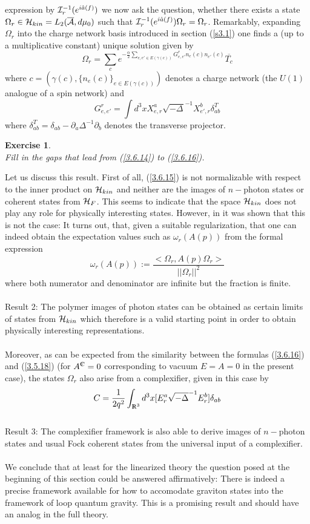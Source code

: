 \documentclass[12pt]{report}
\newtheorem{Exercise}{Exercise}[section]
\def\be{\begin{equation}}
\def\ee{\end{equation}}
\def\a{{\cal A}}
\def\ab{\overline{\a}}
\def\Rl{{\mathchoice
{\setbox0=\hbox{$\displaystyle\rm R$}\hbox{\hbox to0pt
{\kern0.4\wd0\vrule height0.9\ht0\hss}\box0}}
{\setbox0=\hbox{$\textstyle\rm R$}\hbox{\hbox to0pt
{\kern0.4\wd0\vrule height0.9\ht0\hss}\box0}}
{\setbox0=\hbox{$\scriptstyle\rm R$}\hbox{\hbox to0pt
{\kern0.4\wd0\vrule height0.9\ht0\hss}\box0}}
{\setbox0=\hbox{$\scriptscriptstyle\rm R$}\hbox{\hbox to0pt
{\kern0.4\wd0\vrule height0.9\ht0\hss}\box0}}}}
\def\Cl{{\mathchoice
{\setbox0=\hbox{$\displaystyle\rm C$}\hbox{\hbox to0pt
{\kern0.4\wd0\vrule height0.9\ht0\hss}\box0}}
{\setbox0=\hbox{$\textstyle\rm C$}\hbox{\hbox to0pt
{\kern0.4\wd0\vrule height0.9\ht0\hss}\box0}}
{\setbox0=\hbox{$\scriptstyle\rm C$}\hbox{\hbox to0pt
{\kern0.4\wd0\vrule height0.9\ht0\hss}\box0}}
{\setbox0=\hbox{$\scriptscriptstyle\rm C$}\hbox{\hbox to0pt
{\kern0.4\wd0\vrule height0.9\ht0\hss}\box0}}}}
\begin{document}
expression by ${\cal I}_r^{-1}(e^{i\hat{a}(f)})$ we now ask 
the question, whether there exists a state $\Omega_r\in {\cal H}_{kin}
=L_2(\ab,d\mu_0)$ such that 
${\cal I}_r^{-1}(e^{i\hat{a}(f)})\Omega_r=\Omega_r$. Remarkably, expanding
$\Omega_r$ into the charge network basis introduced in section 
(\ref{s3.1}) one finds a (up to a multiplicative constant) 
unique solution given by
\be \label{3.6.15}
\Omega_r=\sum_c
e^{-\frac{\alpha}{2}\sum_{e,e'\in E(\gamma(c))} G^r_{e,e'} n_e(c) 
n_{e'}(c)} \overline{T_c}
\ee
where $c=(\gamma(c),\{n_e(c)\}_{e\in E(\gamma(c))})$ denotes
a charge network (the $U(1)$ analogue of a spin network) and
\be \label{3.6.16}
G^r_{e,e'}=\int d^3x X^a_{e,r}\sqrt{-\Delta}^{-1} X^b_{e',r}\delta^T_{ab}
\ee
where $\delta_{ab}^T=\delta_{ab}-\partial_a\Delta^{-1}\partial_b$
denotes the transverse projector.
%
\begin{Exercise} \label{ex3.6.1} ~~~~\\
Fill in the gaps that lead from (\ref{3.6.14}) to (\ref{3.6.16}).
\end{Exercise}
%
Let us discuss this result. First of all, (\ref{3.6.15}) is not 
normalizable with respect to the inner product on ${\cal H}_{kin}$
and neither are the images of $n-$photon states or coherent states
from ${\cal H}_F$. This seems to indicate that the space ${\cal H}_{kin}$
does not play any role for physically interesting states. However, in
\cite{63} it was shown that this is not the case: It turns out,
that, given a suitable regularization, that one can indeed obtain the 
expectation values such 
as $\omega_r(A(p))$ from the formal expression
\be \label{3.6.18}
\omega_r(A(p)):=\frac{<\Omega_r,A(p)\Omega_r>}{||\Omega_r||^2}
\ee
where both numerator and denominator are infinite but the fraction is 
finite.\\
\\
Result 2: The polymer images of photon states can be obtained as 
certain limits of states from ${\cal H}_{kin}$ which therefore is a valid 
starting point in order to obtain physically interesting representations.\\
\\
Moreover, as can be expected from the similarity between the formulas 
(\ref{3.6.16}) and (\ref{3.5.18}) (for $A^\Cl=0$ corresponding 
to vacuum $E=A=0$ in the present case), the states $\Omega_r$
also arise from a complexifier, given in this case by
\be \label{3.6.19}
C=\frac{1}{2q^2} \int_{\Rl^3} d^3x 
[E^a_r \sqrt{-\Delta}^{-1} E^b_r]\delta_{ab}
\ee
\\
Result 3: The complexifier framework is also able to derive images of 
$n-$photon states and usual Fock coherent states from the universal 
input of a complexifier.\\
\\
We conclude that at least for the linearized theory the question
posed at the beginning of this section could be answered affirmatively:
There is indeed a precise framework available for how to accomodate
graviton states into the framework of loop quantum gravity. 
This is a promising result and should have an analog in the full theory.  
\end{document}
